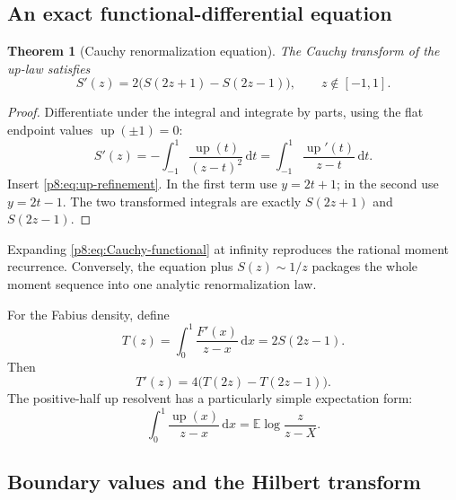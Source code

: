 \documentclass[11pt,oneside]{article}
\newtheorem{theorem}{Theorem}[section]
\theoremstyle{definition}
\theoremstyle{remark}
\newcommand{\Up}{\operatorname{up}}
\newcommand{\E}{\mathbb E}
\newcommand{\dd}{\,\mathrm d}
\newcommand{\1}{\mathbf 1}
\begin{document}
\subsection{An exact functional-differential equation}

\begin{theorem}[Cauchy renormalization equation]
\label{p8:thm:Cauchy-functional}
The Cauchy transform of the up-law satisfies
\begin{equation}
 \boxed{
 S'(z)=2\bigl(S(2z+1)-S(2z-1)\bigr),
 \qquad z\notin[-1,1].}
 \label{p8:eq:Cauchy-functional}
\end{equation}
\statusprovedPartll
\end{theorem}

\begin{proof}
Differentiate under the integral and integrate by parts, using the flat endpoint
values \(\Up(\pm1)=0\):
\[
 S'(z)=-\int_{-1}^1\frac{\Up(t)}{(z-t)^2}\dd t
 =\int_{-1}^1\frac{\Up'(t)}{z-t}\dd t.
\]
Insert \eqref{p8:eq:up-refinement}.  In the first term use \(y=2t+1\); in the
second use \(y=2t-1\).  The two transformed integrals are exactly
\(S(2z+1)\) and \(S(2z-1)\).
\end{proof}

Expanding \eqref{p8:eq:Cauchy-functional} at infinity reproduces the rational
moment recurrence.  Conversely, the equation plus \(S(z)\sim1/z\) packages the
whole moment sequence into one analytic renormalization law.

For the Fabius density, define
\begin{equation}
 T(z)=\int_0^1\frac{F'(x)}{z-x}\dd x=2S(2z-1).
 \label{p8:eq:F-density-Cauchy}
\end{equation}
Then
\begin{equation}
 T'(z)=4\bigl(T(2z)-T(2z-1)\bigr).
 \label{p8:eq:F-density-Cauchy-functional}
\end{equation}
The positive-half up resolvent has a particularly simple expectation form:
\begin{equation}
 \boxed{
 \int_0^1\frac{\Up(x)}{z-x}\dd x
 =\E\log\frac{z}{z-X}.}
 \label{p8:eq:half-resolvent-log}
\end{equation}

\subsection{Boundary values and the Hilbert transform}
\end{document}
